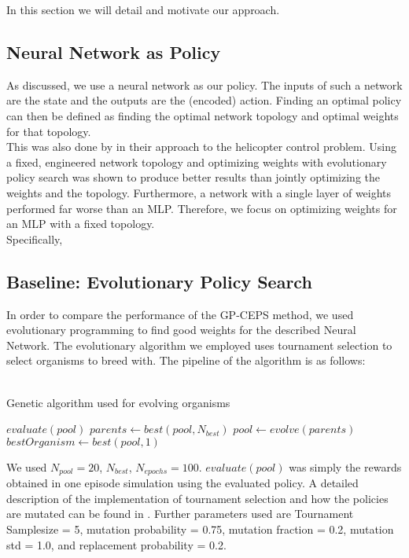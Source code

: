 In this section we will detail and motivate our approach. 

\subsection{Neural Network as Policy}

As discussed, we use a neural network as our policy. The inputs of such a network are the state and the outputs are the (encoded) action. Finding an optimal policy can then be defined as finding the optimal network topology and optimal weights for that topology.\\
This was also done by \cite{koppejan2011neuroevolutionary} in their approach to the helicopter control problem. Using a fixed, engineered network topology and optimizing weights with evolutionary policy search was shown to produce better results than jointly optimizing the weights and the topology. Furthermore, a network with a single layer of weights performed far worse than an MLP. Therefore, we focus on optimizing weights for an MLP with a fixed topology.\\
Specifically, %

\subsection{Baseline: Evolutionary Policy Search}

In order to compare the performance of the GP-CEPS method, we used evolutionary programming to find good weights for the described Neural Network. 
The evolutionary algorithm we employed uses tournament selection to select organisms to breed with. The pipeline of the algorithm is as follows:\\ \\

\begin{algorithm}[ht]
  \caption{Genetic algorithm used for evolving organisms}
  \begin{algorithmic}
      \State $evaluate(pool)$
      \State $parents \leftarrow best(pool, N_{best})$
      \State $pool \leftarrow evolve(parents)$
    \EndFor
    \State $bestOrganism \leftarrow best(pool,1)$
  \end{algorithmic}
\end{algorithm}

We used $N_{pool} = 20$, $N_{best}$, $N_{epochs} = 100$. $evaluate(pool)$ was simply the rewards obtained in one episode simulation using the evaluated policy.  
A detailed description of the implementation of tournament selection and how the policies are mutated can be found in \cite{koppejan2011neuroevolutionary}. Further parameters used are Tournament Samplesize = 5, mutation probability = 0.75, mutation fraction = 0.2, mutation std = 1.0, and replacement probability = 0.2. 

